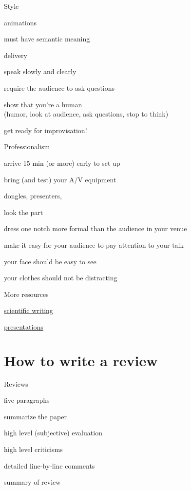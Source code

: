 \documentclass[presentation,xcolor={usenames,dvipsnames}]{beamer}
\begin{document}
\begin{frame}{Style}

animations
\bit
\item must have semantic meaning
\eit

delivery
\bit
\item speak slowly and clearly
\item require the audience to ask questions
\item show that you're a human \\
(humor, look at audience, ask questions, stop to think)
\item get ready for improvisation!
\eit

\end{frame}

\begin{frame}{Professionalism}

  \bit
  \item arrive 15 min (or more) early to set up
  \item bring (and test) your A/V equipment
  \bit \item dongles, presenters, \etc \eit
  \item look the part
  \bit
  \item dress one notch more formal than the audience in your venue
  \item make it easy for your audience to pay attention to your talk
  \bit
  \item your face should be easy to see
  \item your clothes should not be distracting
  \eit
  \eit
  \eit

\end{frame}

\begin{frame}{More resources}

  \bit
  \item \href{http://www.americanscientist.org/issues/id.877,y.0,no.,content.true,page.1,css.print/issue.aspx}{scientific writing}
  \item \href{http://acmg.seas.harvard.edu/education/presentations/carlton_presentations.pdf}{presentations}
  \eit

\end{frame}

\section{How to write a review}

\begin{frame}{Reviews}

five paragraphs
\bit
\item summarize the paper
\item high level (subjective) evaluation
\item high level criticisms
\item detailed line-by-line comments
\item summary of review
\eit

\end{frame}
\end{document}
